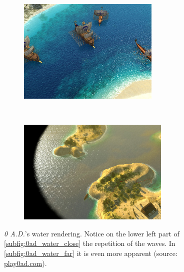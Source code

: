 \begin{figure}[t!]
    \centering
    \begin{subfigure}[t]{\textwidth}
        \centering
        \includegraphics[height=5cm]{figures/0ad_water-specular.jpg}
        \label{subfig:0ad_water_close}
    \end{subfigure}\\%
    \begin{subfigure}[t]{\textwidth}
        \centering
        \includegraphics[height=5cm]{figures/0ad_cycladic_arcgipelago_6.jpg}
        \label{subfig:0ad_water_far}
    \end{subfigure}
    \caption{\textit{0 A.D.}'s water rendering. Notice on the lower left part
        of \autoref{subfig:0ad_water_close} the repetition of the waves.
        In \autoref{subfig:0ad_water_far} it is even more apparent (source:
        \url{play0ad.com}).}\label{fig:0ad_water}
\end{figure}
